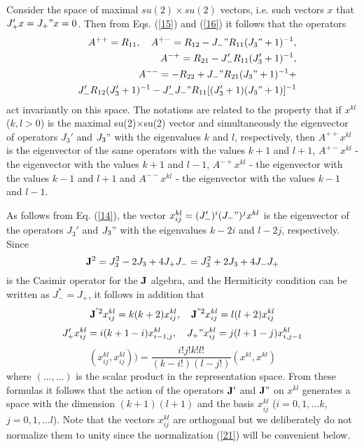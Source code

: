 \documentclass[a4paper,12pt]{article}%
\begin{document}
Consider the space of maximal  $su(2)\times su(2)$  vectors,
i.e.  such vectors $x$ that $J_+'x=J_+"x=0$. Then from
Eqs. (\ref{15}) and (\ref{16}) it follows that the operators
\begin{eqnarray}
&&A^{++}=R_{11},\quad  A^{+-}=R_{12}-
J_-"R_{11}(J_3"+1)^{-1},  \nonumber\\
&&A^{-+}=R_{21}-J_-'R_{11}(J_3'+1)^{-1},\nonumber\\
&&A^{--}=-R_{22}+J_-"R_{21}(J_3"+1)^{-1}+\nonumber\\
&&J_-'R_{12}(J_3'+1)^{-1}-J_-'J_-"R_{11}[(J_3'+1)(J_3"+1)]^{-1}
\label{18}
\end{eqnarray}
act invariantly on this space.
The notations are related to the property  that
if $x^{kl}$  ($k,l>0$) is the maximal su(2)$\times$su(2)
vector and simultaneously
the eigenvector of operators $J_3'$ and $J_3"$ with the 
eigenvalues $k$ and $l$, respectively, then  $A^{++}x^{kl}$
is  the  eigenvector  of  the  same
operators with the values $k+1$ and $l+1$, $A^{+-}x^{kl}$ - the
eigenvector  with
the values $k+1$ and $l-1$, $A^{-+}x^{kl}$ - 
the eigenvector with the values  $k-1$ and $l+1$ and 
$A^{--}x^{kl}$ - the eigenvector with the
values $k-1$ and $l-1$.

As follows from Eq. (\ref{14}), the vector $x_{ij}^{kl}
=(J_-')^i(J_-")^jx^{kl}$ is
the eigenvector of the operators $J_3'$ and $J_3"$ with 
the eigenvalues $k-2i$ and $l-2j$, respectively. 
Since 
$${\bf J}^2=J_3^2-2J_3+4J_+J_-=J_3^2+2J_3+4J_-J_+$$
is the Casimir operator for the ${\bf J}$  algebra, and the
Hermiticity condition can be written as $J_-^*=J_+$, 
it  follows  in  addition that 
\begin{equation}
{\bf J}^{'2}x_{ij}^{kl}=k(k+2)x_{ij}^{kl},\quad
{\bf J}^{"2}x_{ij}^{kl}=l(l+2)x_{ij}^{kl}
\label{19}
\end{equation}
\begin{equation}
J_+'x_{ij}^{kl}=i (k+1-i)x_{i -1,j}^{kl},
\quad  J_+"x_{ij}^{kl}=j (l+1-j)x_{i,j -1}^{kl}
\label{20}
\end{equation}
\begin{equation}
(x_{ij}^{kl},x_{ij}^{kl}))=
\frac{i !j !k!l!}{(k-i !)(l-j !)}(x^{kl},x^{kl})
\label{21}
\end{equation}
where $(...,...)$ is the scalar product in the representation space.
From these formulas it follows that the action of 
the operators ${\bf J}'$
and ${\bf J}"$ on $x^{kl}$  generates a space with the  
dimension $(k+1)(l+1)$  and  the
basis $x_{ij}^{kl}$ ($i=0,1,...k$, $j=0,1,...l$).
Note that the vectors $x_{ij}^{kl}$   are
orthogonal but we deliberately do not normalize them to 
unity since the normalization (\ref{21}) will be convenient below.
\end{document}
